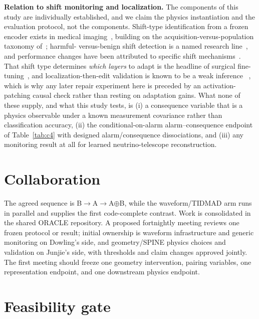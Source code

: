 \documentclass[10pt,twocolumn]{extarticle}
\begin{document}
\textbf{Relation to shift monitoring and localization.} The components of this
study are individually established, and we claim the physics instantiation and
the evaluation protocol, not the components. Shift-type identification from a
frozen encoder exists in medical imaging~\cite{roschewitz2024}, building on
the acquisition-versus-population taxonomy of~\cite{castro2020}; harmful-%
versus-benign shift detection is a named research line~\cite{podkopaev2022,
rabanser2019}, and performance changes have been attributed to specific shift
mechanisms~\cite{zhang2023}. That shift type determines \emph{which layers} to
adapt is the headline of surgical fine-tuning~\cite{lee2023surgical}, and
localization-then-edit validation is known to be a weak inference~%
\cite{hase2023}, which is why any later repair experiment here is preceded by
an activation-patching causal check rather than resting on adaptation gains.
What none of these supply, and what this study tests, is (i) a consequence
variable that is a physics observable under a known measurement covariance
rather than classification accuracy, (ii) the conditional-on-alarm
alarm--consequence endpoint of Table~\ref{tab:c4} with designed
alarm/consequence dissociations, and (iii) any monitoring result at all for
learned neutrino-telescope reconstruction.

\section{Collaboration}

The agreed sequence is B$\rightarrow$A$\rightarrow$A$\oplus$B, while the
waveform/TIDMAD arm runs in parallel and supplies the first code-complete
contrast. Work is consolidated in the shared ORACLE repository. A proposed
fortnightly meeting reviews one frozen
protocol or result; initial ownership is waveform infrastructure and generic
monitoring on Dowling's side, and geometry/SPINE physics choices and validation
on Junjie's side, with thresholds and claim changes approved jointly. The first
meeting should freeze one geometry intervention, pairing variables, one
representation endpoint, and one downstream physics endpoint.

\section{Feasibility gate}
\end{document}

